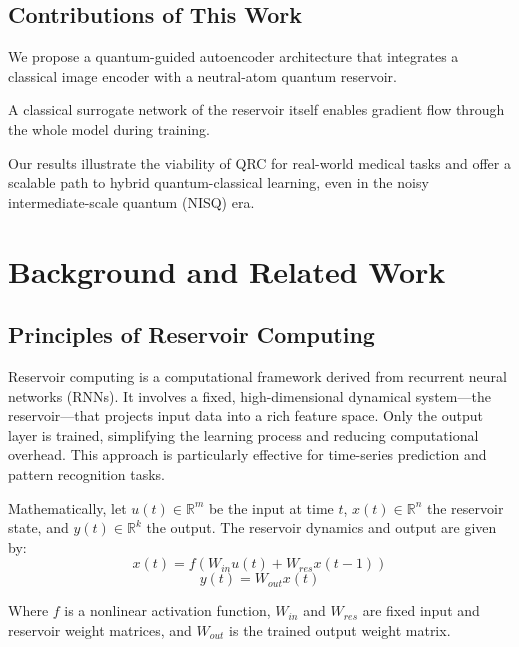 \documentclass[conference]{IEEEtran}
\begin{document}
\subsection{Contributions of This Work}
We propose a quantum-guided autoencoder architecture that integrates a classical image encoder with a neutral-atom quantum reservoir.

A classical surrogate network of the reservoir itself enables 
gradient flow through the whole model during training.

Our results illustrate the viability of QRC for real-world medical 
tasks and offer a scalable path to hybrid quantum-classical learning,
even in the noisy intermediate-scale quantum (NISQ) era.



\section{Background and Related Work}

\subsection{Principles of Reservoir Computing}
Reservoir computing is a computational framework 
derived from recurrent neural networks (RNNs). It 
involves a fixed, high-dimensional dynamical system—the 
reservoir—that projects input data into a rich feature 
space. Only the output layer is trained, simplifying 
the learning process and reducing computational 
overhead. This approach is particularly effective 
for time-series prediction and pattern recognition tasks.

Mathematically, let \( u(t) \in \mathbb{R}^m \) be the input at time \( t \),
\( x(t) \in \mathbb{R}^n \) the reservoir state, and
\( y(t) \in \mathbb{R}^k \) the output. The reservoir dynamics
and output are given by:
\begin{equation}
    x(t) = f(W_{in} u(t) + W_{res} x(t-1))
\end{equation}
\begin{equation}
    y(t) = W_{out} x(t)
\end{equation}


Where \( f \) is a nonlinear activation function,
\( W_{in} \) and \( W_{res} \) are fixed input and reservoir weight matrices, 
and \( W_{out} \) is the trained output weight matrix.
\end{document}
